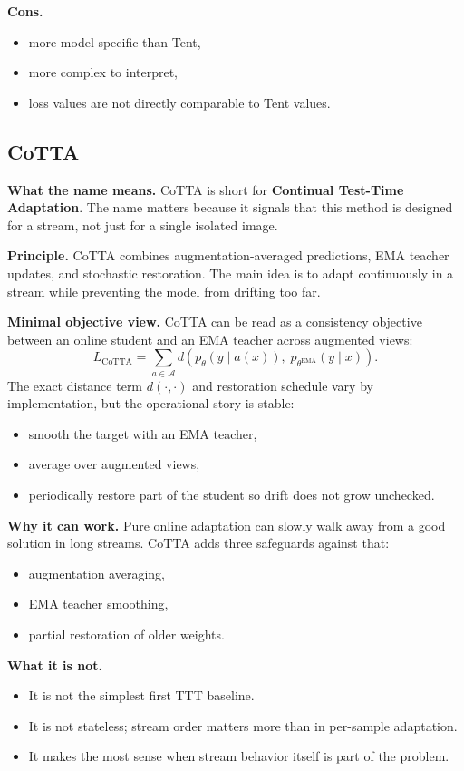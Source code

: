 \textbf{Cons.}
\begin{itemize}
  \item more model-specific than Tent,
  \item more complex to interpret,
  \item loss values are not directly comparable to Tent values.
\end{itemize}

\subsection{CoTTA}
\textbf{What the name means.}
CoTTA is short for \textbf{Continual Test-Time Adaptation}.
The name matters because it signals that this method is designed for a stream, not just for a single isolated image.

\textbf{Principle.}
CoTTA combines augmentation-averaged predictions, EMA teacher updates, and stochastic restoration. The main idea is to adapt continuously in a stream while preventing the model from drifting too far.

\textbf{Minimal objective view.}
CoTTA can be read as a consistency objective between an online student and an EMA teacher across augmented views:
\[
L_{\mathrm{CoTTA}} = \sum_{a \in \mathcal{A}} d\!\left(p_{\theta}(y \mid a(x)),\; p_{\theta^{\mathrm{EMA}}}(y \mid x)\right).
\]
The exact distance term $d(\cdot,\cdot)$ and restoration schedule vary by implementation, but the operational story is stable:
\begin{itemize}
  \item smooth the target with an EMA teacher,
  \item average over augmented views,
  \item periodically restore part of the student so drift does not grow unchecked.
\end{itemize}

\textbf{Why it can work.}
Pure online adaptation can slowly walk away from a good solution in long streams.
CoTTA adds three safeguards against that:
\begin{itemize}
  \item augmentation averaging,
  \item EMA teacher smoothing,
  \item partial restoration of older weights.
\end{itemize}

\textbf{What it is not.}
\begin{itemize}
  \item It is not the simplest first TTT baseline.
  \item It is not stateless; stream order matters more than in per-sample adaptation.
  \item It makes the most sense when stream behavior itself is part of the problem.
\end{itemize}

